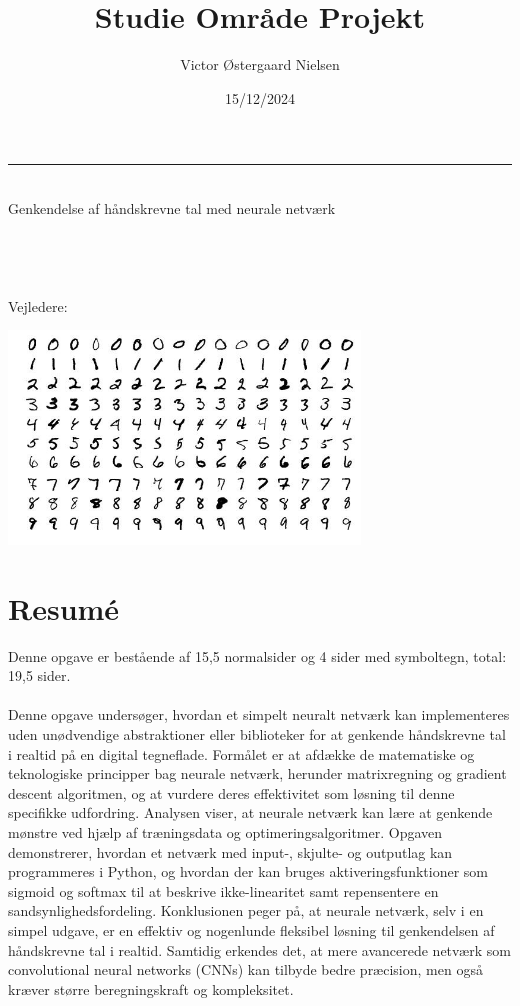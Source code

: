 \documentclass{article}
\title{\Huge{Studie Område Projekt}}
\author{Victor Østergaard Nielsen}
\date{15/12/2024}
\makeatletter
\renewcommand{\maketitle}{\bgroup\setlength{\parindent}{0pt}
\begin{flushleft}
  \textbf{\@title}
  \rule{\textwidth}{0.2pt}\\\vspace{0.2em}
  \huge{
    Genkendelse af håndskrevne tal med neurale netværk
  }\\\vspace{1em}
  \normalsize
  \@subject\\\vspace{1em}
  \@author\\
  \@class\\
  \@date\\\vspace{1em}
  Vejledere:\\\@mentor
\end{flushleft}\egroup
}
\makeatother
\begin{document}
\thispagestyle{empty}


\maketitle
\vspace{3cm}
\begin{center}
  \includegraphics[width=0.7\textwidth]{MNIST3.jpg}
\end{center}
\thispagestyle{empty}
\newpage

\section*{Resumé}
Denne opgave er bestående af 15,5 normalsider og 4 sider med symboltegn, total: 19,5 sider.\\\\
Denne opgave undersøger, hvordan et simpelt neuralt netværk kan implementeres uden unødvendige abstraktioner eller biblioteker for at genkende håndskrevne tal i realtid på en digital tegneflade. Formålet er at afdække de matematiske og teknologiske principper bag neurale netværk, herunder matrixregning og gradient descent algoritmen, og at vurdere deres effektivitet som løsning til denne specifikke udfordring. Analysen viser, at neurale netværk kan lære at genkende mønstre ved hjælp af træningsdata og optimeringsalgoritmer. Opgaven demonstrerer, hvordan et netværk med input-, skjulte- og outputlag kan programmeres i Python, og hvordan der kan bruges aktiveringsfunktioner som sigmoid og softmax til at beskrive ikke-linearitet samt repensentere en sandsynlighedsfordeling. Konklusionen peger på, at neurale netværk, selv i en simpel udgave, er en effektiv og nogenlunde fleksibel løsning til genkendelsen af håndskrevne tal i realtid. Samtidig erkendes det, at mere avancerede netværk som convolutional neural networks (CNNs) kan tilbyde bedre præcision, men også kræver større beregningskraft og kompleksitet.
\newpage
\end{document}
